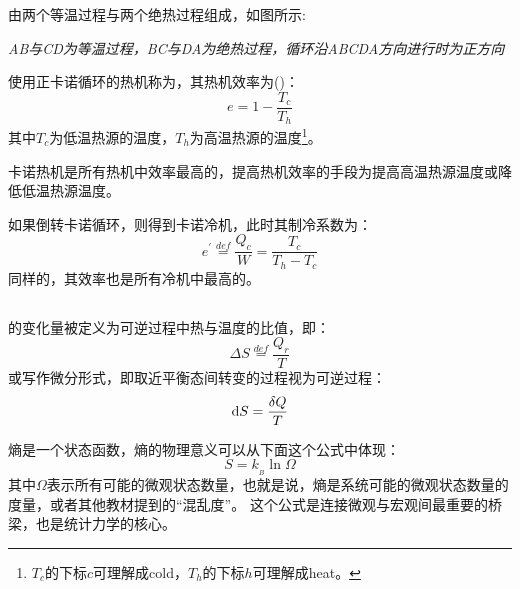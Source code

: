             由两个等温过程与两个绝热过程组成，如图所示:
            \vspace{1ex}
            \begin{center}
            	\em AB与CD为等温过程，BC与DA为绝热过程，循环沿ABCDA方向进行时为正方向
            \end{center}
            使用正卡诺循环的热机称为，其热机效率为()：
            \begin{equation}
                e = 1 - \frac{T_{c}}{T_{h}}
                \nonumber
            \end{equation}
            其中$T_c$为低温热源的温度，$T_h$为高温热源的温度\footnote{$T_c$的下标$c$可理解成cold，$T_h$的下标$h$可理解成heat。}。

            卡诺热机是所有热机中效率最高的，提高热机效率的手段为提高高温热源温度或降低低温热源温度。
            
            如果倒转卡诺循环，则得到卡诺冷机，此时其制冷系数为：
            \begin{equation}
                e^{\prime} \overset{def}{=} \frac{Q_c}{W} = \frac{T_c}{T_h - T_c}
                \nonumber
            \end{equation}
            同样的，其效率也是所有冷机中最高的。
        \subsection[熵]{}
            的变化量被定义为可逆过程中热与温度的比值，即：
            \begin{equation}
                \Delta S \overset{def}{=} \frac{Q_r}{T} 
                \nonumber
            \end{equation}
            或写作微分形式，即取近平衡态间转变的过程视为可逆过程：
            \begin{equation}
                \dif{S} = \frac{\delta{Q}}{T} 
                \nonumber
            \end{equation}
            
            熵是一个状态函数，熵的物理意义可以从下面这个公式中体现：
            \begin{equation}
                S = k_{_B}\ln\Omega
                \nonumber
            \end{equation}
            其中$\Omega$表示所有可能的微观状态数量，也就是说，熵是系统可能的微观状态数量的度量，或者其他教材提到的“混乱度”。
            这个公式是连接微观与宏观间最重要的桥梁，也是统计力学的核心。

